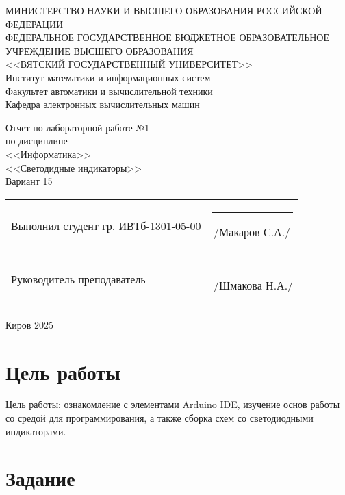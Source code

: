 \documentclass[a4paper,14pt]{extarticle}
\begin{document}
  \newpage\thispagestyle{empty}
  \begin{center}
    \MakeUppercase{
      Министерство науки и высшего образования Российской Федерации\\
      Федеральное государственное бюджетное образовательное учреждение высшего образования\\
      <<Вятский Государственный Университет>>\\
    }
    Институт математики и информационных систем\\
    Факультет автоматики и вычислительной техники\\
    Кафедра электронных вычислительных машин
  \end{center}
  \vfill

  \begin{center}
    Отчет по лабораторной работе №1\\
    по дисциплине\\
    <<Информатика>>\\
    <<Светодидные индикаторы>>\\
    Вариант 15
  \end{center}
  \vfill

  \noindent
  \begin{tabular}{ll}
    Выполнил студент гр. ИВТб-1301-05-00 \hspace{5mm} &
    \rule[-1mm]{25mm}{0.10mm}\,/Макаров С.А./\\
    
    Руководитель преподаватель & \rule[-1mm]{25mm}{0.10mm}\,/Шмакова Н.А./\\
  \end{tabular}

  \vfill
  \begin{center}
    Киров 2025
  \end{center}

  \newpage
  \section*{\hspace{12.5mm}Цель работы}
  Цель работы: ознакомление с элементами Arduino IDE, изучение основ
  работы со средой для программирования, а также сборка схем со
  светодиодными индикаторами.

  \section*{\hspace{12.5mm}Задание}
\end{document}
